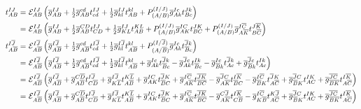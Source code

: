 \documentclass[11pt,fleqn]{article}
\begin{document}
\begin{align*}
  t_{AB}^{IJ}
=&\
  \mathcal{E}_{AB}^{IJ}
  \left(
    \overline{g}_{AB}^{IJ}
  +
    \tfrac{1}{2}
    \overline{g}_{AB}^{cd}
    t_{cd}^{IJ}
  +
    \tfrac{1}{2}
    \overline{g}_{kl}^{IJ}
    t_{AB}^{kl}
  +
    P^{(I/J)}_{(A/B)}
    \overline{g}_{Ak}^{Ic}
    t_{Bc}^{Jk}
  \right)
\\=&\
  \mathcal{E}_{AB}^{IJ}
  \left(
    \overline{g}_{AB}^{IJ}
  +
    \tfrac{1}{2}
    \overline{g}_{AB}^{CD}
    t_{CD}^{IJ}
  +
    \tfrac{1}{2}
    \overline{g}_{KL}^{IJ}
    t_{AB}^{KL}
  +
    P^{(I/J)}_{(A/B)}
    \overline{g}_{AK}^{IC}
    t_{BC}^{JK}
  +
    P^{(I/J)}_{(A/B)}
    \overline{g}_{A\overline{K}}^{I\overline{C}}
    t_{B\overline{C}}^{J\overline{K}}
  \right)
\\
  t_{A\overline{B}}^{I\overline{J}}
=&\
  \mathcal{E}_{A\overline{B}}^{I\overline{J}}
  \left(
    \overline{g}_{A\overline{B}}^{I\overline{J}}
  +
    \tfrac{1}{2}
    \overline{g}_{A\overline{B}}^{cd}
    t_{cd}^{I\overline{J}}
  +
    \tfrac{1}{2}
    \overline{g}_{kl}^{I\overline{J}}
    t_{A\overline{B}}^{kl}
  +
    P^{(I/\overline{J})}_{(A/\overline{B})}
    \overline{g}_{Ak}^{Ic}
    t_{\overline{B}c}^{\overline{J}k}
  \right)
\\=&\
  \mathcal{E}_{A\overline{B}}^{I\overline{J}}
  \left(
    \overline{g}_{A\overline{B}}^{I\overline{J}}
  +
    \tfrac{1}{2}
    \overline{g}_{A\overline{B}}^{cd}
    t_{cd}^{I\overline{J}}
  +
    \tfrac{1}{2}
    \overline{g}_{kl}^{I\overline{J}}
    t_{A\overline{B}}^{kl}
  +
    \overline{g}_{Ak}^{Ic}
    t_{\overline{B}c}^{\overline{J}k}
  -
    \overline{g}_{Ak}^{\overline{J}c}
    t_{\overline{B}c}^{Ik}
  -
    \overline{g}_{\overline{B}k}^{Ic}
    t_{Ac}^{\overline{J}k}
  +
    \overline{g}_{\overline{B}k}^{\overline{J}c}
    t_{Ac}^{Ik}
  \right)
\\=&\
  \mathcal{E}_{A\overline{B}}^{I\overline{J}}
  \left(
    \overline{g}_{A\overline{B}}^{I\overline{J}}
  +
    \overline{g}_{A\overline{B}}^{C\overline{D}}
    t_{C\overline{D}}^{I\overline{J}}
  +
    \overline{g}_{K\overline{L}}^{I\overline{J}}
    t_{A\overline{B}}^{K\overline{L}}
  +
    \overline{g}_{AK}^{IC}
    t_{\overline{B}C}^{\overline{J}K}
  +
    \overline{g}_{A\overline{K}}^{I\overline{C}}
    t_{\overline{B}\overline{C}}^{\overline{J}\overline{K}}
  -
    \overline{g}_{A\overline{K}}^{\overline{J}C}
    t_{\overline{B}C}^{I\overline{K}}
  -
    \overline{g}_{\overline{B}K}^{I\overline{C}}
    t_{A\overline{C}}^{\overline{J}K}
  +
    \overline{g}_{\overline{B}K}^{\overline{J}C}
    t_{AC}^{IK}
  +
    \overline{g}_{\overline{B}\overline{K}}^{\overline{J}\overline{C}}
    t_{A\overline{C}}^{I\overline{K}}
  \right)
\\=&\
  \mathcal{E}_{A\overline{B}}^{I\overline{J}}
  \left(
    \overline{g}_{A\overline{B}}^{I\overline{J}}
  +
    \overline{g}_{A\overline{B}}^{C\overline{D}}
    t_{C\overline{D}}^{I\overline{J}}
  +
    \overline{g}_{K\overline{L}}^{I\overline{J}}
    t_{A\overline{B}}^{K\overline{L}}
  +
    \overline{g}_{AK}^{IC}
    t_{\overline{B}C}^{\overline{J}K}
  +
    \overline{g}_{A\overline{K}}^{I\overline{C}}
    t_{\overline{B}\overline{C}}^{\overline{J}\overline{K}}
  -
    \overline{g}_{A\overline{K}}^{C\overline{J}}
    t_{C\overline{B}}^{I\overline{K}}
  -
    \overline{g}_{K\overline{B}}^{I\overline{C}}
    t_{A\overline{C}}^{K\overline{J}}
  +
    \overline{g}_{\overline{B}K}^{\overline{J}C}
    t_{AC}^{IK}
  +
    \overline{g}_{\overline{B}\overline{K}}^{\overline{J}\overline{C}}
    t_{A\overline{C}}^{I\overline{K}}
  \right)
\end{align*}
\end{document}
